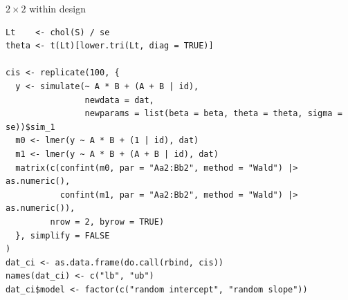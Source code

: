 \documentclass[aspectratio=169]{beamer}
\begin{document}
\begin{frame}[fragile]{$2\times 2$ within design}
  \footnotesize
  \begin{lstlisting}
Lt    <- chol(S) / se
theta <- t(Lt)[lower.tri(Lt, diag = TRUE)]

cis <- replicate(100, {
  y <- simulate(~ A * B + (A + B | id),
                newdata = dat,
                newparams = list(beta = beta, theta = theta, sigma = se))$sim_1
  m0 <- lmer(y ~ A * B + (1 | id), dat)
  m1 <- lmer(y ~ A * B + (A + B | id), dat)
  matrix(c(confint(m0, par = "Aa2:Bb2", method = "Wald") |> as.numeric(),
           confint(m1, par = "Aa2:Bb2", method = "Wald") |> as.numeric()),
         nrow = 2, byrow = TRUE)
  }, simplify = FALSE
)
dat_ci <- as.data.frame(do.call(rbind, cis))
names(dat_ci) <- c("lb", "ub")
dat_ci$model <- factor(c("random intercept", "random slope"))
  \end{lstlisting}
\end{frame}
\end{document}
